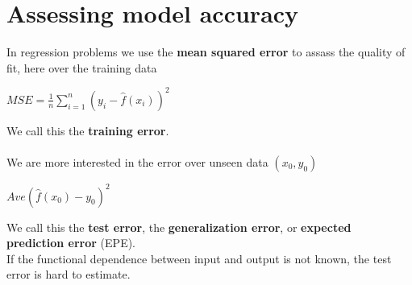 	\section{Assessing model accuracy}
		In regression problems we use the \textbf{mean squared error} to assass the quality of fit, here over the training data
		\begin{center}
			$MSE = \frac{1}{n} \sum\limits_{i=1}^n (y_i - \hat{f}(x_i))^2$
		\end{center}
		We call this the \textbf{training error}.\\\\
		We are more interested in the error over unseen data $(x_0,y_0)$
		\begin{center}
			$Ave(\hat{f}(x_0)-y_0)^2$
		\end{center}
		We call this the \textbf{test error}, the \textbf{generalization error}, or \textbf{expected prediction error} (EPE).\\
		If the functional dependence between input and output is not known, the test error is hard to estimate.
\newpage	
		\begin{figure}[ht]
		  \centering
		  \qquad
		\end{figure}
